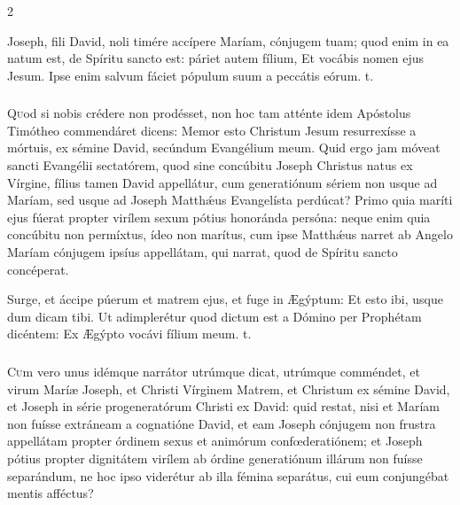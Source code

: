 \documentclass[9pt,twoside]{extarticle}
\begin{document}
\begin{multicols}{2}
\begin{tightlist}{}
\item {} Joseph, fili David, noli timére accípere Maríam, cónjugem tuam; quod enim in ea natum est, de Spíritu sancto est: páriet autem fílium, \textred{*} Et vocábis nomen ejus Jesum.  Ipse enim salvum fáciet pópulum suum a peccátis eórum. t.
\end{tightlist}

\subsubsection*{\center {}}
\lettrine{Q}uod si nobis crédere non prodésset, non hoc tam atténte idem Apóstolus Timótheo commendáret dicens: Memor esto Christum Jesum resurrexísse a mórtuis, ex sémine David, secúndum Evangélium meum. Quid ergo jam móveat sancti Evangélii sectatórem, quod sine concúbitu Joseph Christus natus ex Vírgine, fílius tamen David appellátur, cum generatiónum sériem non usque ad Maríam, sed usque ad Joseph Matthǽus Evangelísta perdúcat? Primo quia maríti ejus fúerat propter virílem sexum pótius honoránda persóna: neque enim quia concúbitu non permíxtus, ídeo non marítus, cum ipse Matthǽus narret ab Angelo Maríam cónjugem ipsíus appellátam, qui narrat, quod de Spíritu sancto concéperat.

\begin{tightlist}{}
\item {} Surge, et áccipe púerum et matrem ejus, et fuge in Ægýptum: \textred{*} Et esto ibi, usque dum dicam tibi.  Ut adimplerétur quod dictum est a Dómino per Prophétam dicéntem: Ex Ægýpto vocávi fílium meum. t.
\end{tightlist}

\subsubsection*{\center {}}
\lettrine{C}um vero unus idémque narrátor utrúmque dicat, utrúmque comméndet, et virum Maríæ Joseph, et Christi Vírginem Matrem, et Christum ex sémine David, et Joseph in série progeneratórum Christi ex David: quid restat, nisi et Maríam non fuísse extráneam a cognatióne David, et eam Joseph cónjugem non frustra appellátam propter órdinem sexus et animórum confœderatiónem; et Joseph pótius propter dignitátem virílem ab órdine generatiónum illárum non fuísse separándum, ne hoc ipso viderétur ab illa fémina separátus, cui eum conjungébat mentis afféctus?


\end{multicols}
\end{document}
